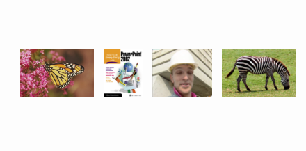 \documentclass[10pt,twocolumn,letterpaper]{article}
\begin{document}
\begin{figure}[]
\centering
\setlength{\tabcolsep}{1pt}
\renewcommand{\arraystretch}{0.2} %
\resizebox{\linewidth}{!}
{
\large
\begin{tabular}{ccccc}
\parbox[b]{3mm}{}&
\includegraphics[height=5cm]{RGB4x/monarch2-Bicubic.png}&
\includegraphics[height=5cm]{RGB4x/ppt32-Bicubic.png}&
\includegraphics[height=5cm]{RGB4x/foreman2-Bicubic.png}&
\includegraphics[height=5cm]{RGB4x/zebra2-Bicubic.png}\\[4pt]

\end{tabular}}
\end{figure}
\end{document}
